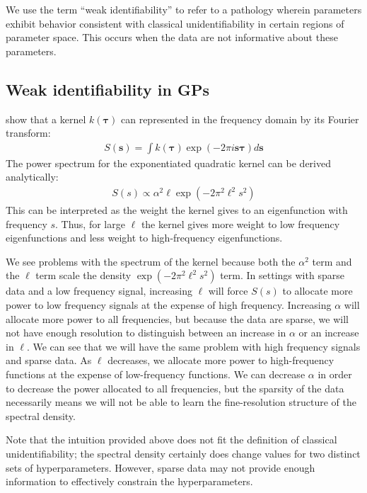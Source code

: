 \documentclass{article}
\begin{document}
We use the term ``weak identifiability'' to refer to a pathology wherein
parameters exhibit behavior consistent with classical unidentifiability in
certain regions of parameter space. This occurs when the data are not
informative about these parameters.  

\subsection{Weak identifiability in GPs}

\citet{rasmussen2005gaussian} show that a kernel $k(\boldsymbol{\tau})$ can
represented in the frequency domain by its Fourier transform:
\begin{align*}
  S(\mathbf{s}) = \int k(\mathbf{\tau}) \exp \left( -2 \pi i \mathbf{s}  \boldsymbol{\tau} \right) d\mathbf{s}
\end{align*}
The power spectrum for the exponentiated quadratic kernel can be derived analytically:
\begin{align*} 
  S(s) \propto \alpha^2 \ell
   \exp \left(
  - 2 \pi^2 \ell^2 s^2
\right)
\end{align*} 
This can be interpreted as the weight the kernel gives to an eigenfunction with
frequency $s$. Thus, for large $\ell$ the kernel gives more weight to low
frequency eigenfunctions and less weight to high-frequency eigenfunctions. 

We see problems with the spectrum of the kernel because both the $\alpha ^ 2$
term and the $\ell$ term scale the density $\exp \left(- 2 \pi^2 \ell^2 s^2
\right)$ term. In settings with sparse data and a low frequency signal,
increasing $\ell$ will force $S(s)$ to allocate more power to low frequency
signals at the expense of high frequency. Increasing $\alpha$ will allocate
more power to all frequencies, but because the data are sparse, we will not
have enough resolution to distinguish between an increase in $\alpha$ or an
increase in $\ell$. We can see that we will have the same problem with high
frequency signals and sparse data. As $\ell$ decreases, we allocate more power
to high-frequency functions at the expense of low-frequency functions. We can
decrease $\alpha$ in order to decrease the power allocated to all frequencies,
but the sparsity of the data necessarily means we will not be able to learn the
fine-resolution structure of the spectral density.

Note that the intuition provided above does not fit the definition of 
classical unidentifiability; the spectral density certainly does change
values for two distinct sets of hyperparameters. However, sparse data
may not provide enough information to effectively constrain the hyperparameters.
\end{document}
